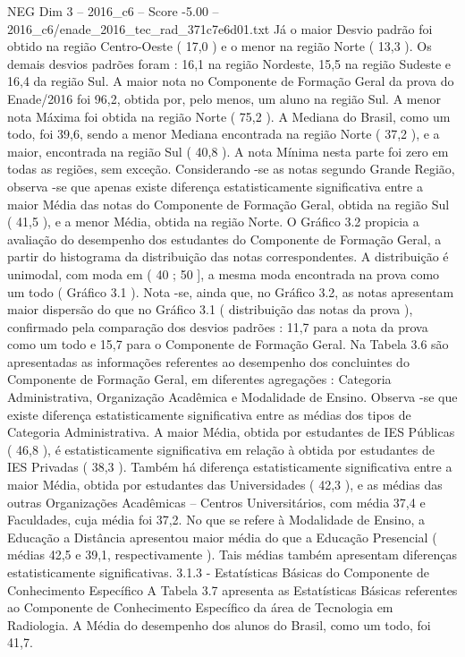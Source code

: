 \begin{textsample}{NEG Dim 3 – 2016\_c6 – Score -5.00 – 2016\_c6/enade\_2016\_tec\_rad\_371c7e6d01.txt}
Já o maior Desvio padrão foi obtido na região Centro-Oeste ( 17,0 ) e o menor na região Norte ( 13,3 ).
Os demais desvios padrões foram : 16,1 na região Nordeste, 15,5 na região Sudeste e 16,4 da região Sul.
A maior nota no Componente de Formação Geral da prova do Enade/2016 foi 96,2, obtida por, pelo menos, um aluno na região Sul.
A menor nota Máxima foi obtida na região Norte ( 75,2 ).
A Mediana do Brasil, como um todo, foi 39,6, sendo a menor Mediana encontrada na região Norte ( 37,2 ), e a maior, encontrada na região Sul ( 40,8 ).
A nota Mínima nesta parte foi zero em todas as regiões, sem exceção.
Considerando -se as notas segundo Grande Região, observa -se que apenas existe diferença estatisticamente significativa entre a maior Média das notas do Componente de Formação Geral, obtida na região Sul ( 41,5 ), e a menor Média, obtida na região Norte.
O Gráfico 3.2 propicia a avaliação do desempenho dos estudantes do Componente de Formação Geral, a partir do histograma da distribuição das notas correspondentes.
A distribuição é unimodal, com moda em ( 40 ; 50 ], a mesma moda encontrada na prova como um todo ( Gráfico 3.1 ).
Nota -se, ainda que, no Gráfico 3.2, as notas apresentam maior dispersão do que no Gráfico 3.1 ( distribuição das notas da prova ), confirmado pela comparação dos desvios padrões : 11,7 para a nota da prova como um todo e 15,7 para o Componente de Formação Geral.
Na Tabela 3.6 são apresentadas as informações referentes ao desempenho dos concluintes do Componente de Formação Geral, em diferentes agregações : Categoria Administrativa, Organização Acadêmica e Modalidade de Ensino.
Observa -se que existe diferença estatisticamente significativa entre as médias dos tipos de Categoria Administrativa.
A maior Média, obtida por estudantes de IES Públicas ( 46,8 ), é estatisticamente significativa em relação à obtida por estudantes de IES Privadas ( 38,3 ).
Também há diferença estatisticamente significativa entre a maior Média, obtida por estudantes das Universidades ( 42,3 ), e as médias das outras Organizações Acadêmicas – Centros Universitários, com média 37,4 e Faculdades, cuja média foi 37,2.
No que se refere à Modalidade de Ensino, a Educação a Distância apresentou maior média do que a Educação Presencial ( médias 42,5 e 39,1, respectivamente ).
Tais médias também apresentam diferenças estatisticamente significativas. 3.1.3 - Estatísticas Básicas do Componente de Conhecimento Específico A Tabela 3.7 apresenta as Estatísticas Básicas referentes ao Componente de Conhecimento Específico da área de Tecnologia em Radiologia.
A Média do desempenho dos alunos do Brasil, como um todo, foi 41,7.

\end{textsample}
